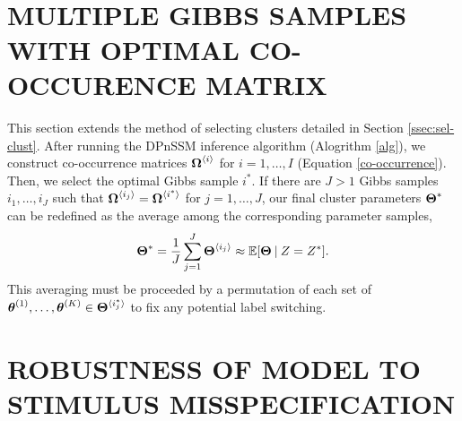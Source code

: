 \documentclass[twoside]{article}
\begin{document}
\begin{algorithm}[H]
\begin{algorithmic}[1]
    \EndFor
   	 \EndFor
    \EndFor
    \EndFor \\
   \end{algorithmic}
\end{algorithm}

\section{MULTIPLE GIBBS SAMPLES WITH OPTIMAL CO-OCCURENCE MATRIX} \label{mult-co}
This section extends the method of selecting clusters detailed in Section \ref{ssec:sel-clust}.  After running the DPnSSM inference algorithm (Alogrithm \ref{alg}), we construct co-occurrence matrices $\boldsymbol{\Omega}^{\langle i\rangle}_{}$  for $i = 1, \ldots, I$ (Equation \ref{co-occurrence}).  Then, we select the optimal Gibbs sample $i^*$.  If there are $J > 1$ Gibbs samples $i_1, \ldots, i_J$ such that $\boldsymbol{\Omega}^{\langle i_j\rangle}_{} = \boldsymbol{\Omega}^{\langle i^*\rangle}_{}$ for $j = 1, \ldots, J$, our final cluster parameters $\boldsymbol{\Theta}^*$ can be redefined as the average among the corresponding parameter samples,
\begin{align} \label{final-params}
\boldsymbol{\Theta}^* = \frac{1}{J} \sum_{j=1}^J \boldsymbol{\Theta}^{\langle i_j\rangle}_{} \approx \mathbb{E}[\boldsymbol{\Theta} \:\vert\: Z = Z^*].
\end{align}
This averaging must be proceeded by a permutation of each set of $\boldsymbol{\theta}^{(1)}_{}, \ldots, \boldsymbol{\theta}^{(K)}_{} \in \boldsymbol{\Theta}^{\langle i_j^*\rangle}_{}$ to fix any potential label switching.     

\section{ROBUSTNESS OF MODEL TO STIMULUS MISSPECIFICATION} \label{sim-robust}
\end{document}
